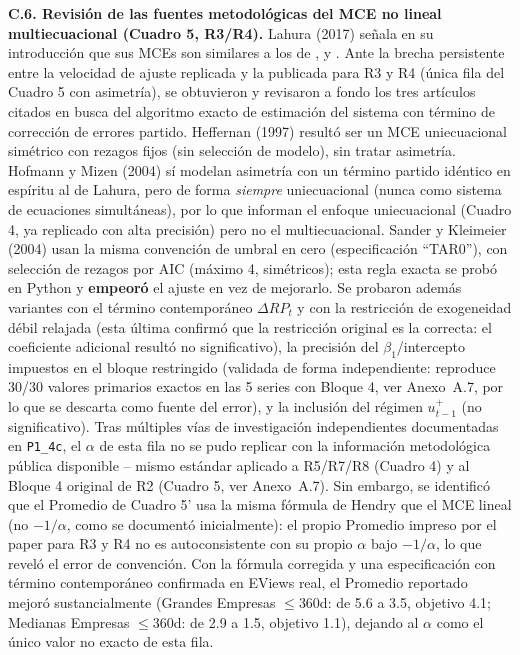 \documentclass[12pt, letterpaper]{article}
\begin{document}
\textbf{C.6. Revisión de las fuentes metodológicas del MCE no lineal
multiecuacional (Cuadro 5, R3/R4).} Lahura (2017) señala en su
introducción que sus MCEs son similares a los de
\textcite{heffernan1997}, \textcite{sander2004} y \textcite{hofmann2004}.
Ante la brecha persistente entre la velocidad de ajuste replicada y la
publicada para R3 y R4 (única fila del Cuadro 5 con asimetría), se
obtuvieron y revisaron a fondo los tres artículos citados en busca del
algoritmo exacto de estimación del sistema con término de corrección
de errores partido. Heffernan (1997) resultó ser un MCE uniecuacional
simétrico con rezagos fijos (sin selección de modelo), sin tratar
asimetría. Hofmann y Mizen (2004) sí modelan asimetría con un término
partido idéntico en espíritu al de Lahura, pero de forma
\textit{siempre} uniecuacional (nunca como sistema de ecuaciones
simultáneas), por lo que informan el enfoque uniecuacional (Cuadro 4,
ya replicado con alta precisión) pero no el multiecuacional. Sander y
Kleimeier (2004) usan la misma convención de umbral en cero
(especificación ``TAR0''), con selección de rezagos por AIC (máximo 4,
simétricos); esta regla exacta se probó en Python y \textbf{empeoró}
el ajuste en vez de mejorarlo. Se probaron además variantes con el
término contemporáneo $\Delta RP_t$ y con la restricción de
exogeneidad débil relajada (esta última confirmó que la restricción
original es la correcta: el coeficiente adicional resultó no
significativo), la precisión del $\beta_1$/intercepto impuestos en el
bloque restringido (validada de forma independiente: reproduce 30/30
valores primarios exactos en las 5 series con Bloque 4, ver Anexo~A.7,
por lo que se descarta como fuente del error), y la inclusión del
régimen $u^{+}_{t-1}$ (no significativo). Tras múltiples vías de
investigación independientes documentadas en \texttt{P1\_4c}, el
$\alpha$ de esta fila no se pudo replicar con la información
metodológica pública disponible -- mismo estándar aplicado a R5/R7/R8
(Cuadro 4) y al Bloque 4 original de R2 (Cuadro 5, ver Anexo~A.7). Sin
embargo, se identificó que el Promedio de Cuadro 5' usa la misma
fórmula de Hendry \parencite{hendry1995} que el MCE lineal (no
$-1/\alpha$, como se documentó inicialmente): el propio Promedio
impreso por el paper para R3 y R4 no es autoconsistente con su propio
$\alpha$ bajo $-1/\alpha$, lo que reveló el error de convención. Con
la fórmula corregida y una especificación con término contemporáneo
confirmada en EViews real, el Promedio reportado mejoró sustancialmente
(Grandes Empresas $\le$360d: de 5.6 a 3.5, objetivo 4.1; Medianas
Empresas $\le$360d: de 2.9 a 1.5, objetivo 1.1), dejando al $\alpha$
como el único valor no exacto de esta fila.

\clearpage
\pagestyle{plain}
\printbibliography[title={Referencias}]
\end{document}
